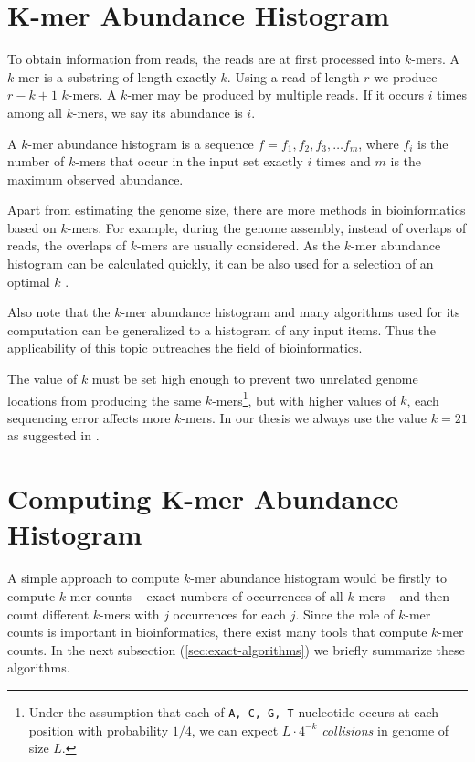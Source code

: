 \section{K-mer Abundance Histogram}
\label{sec:histogram}
To obtain information from reads, the reads are at first processed into $k$-mers. 
A $k$-mer is a substring of length exactly $k$. Using a read of length $r$ we produce 
$r-k+1$ $k$-mers. A $k$-mer may be produced by multiple reads. If it occurs $i$ times
among all $k$-mers, we say its abundance is $i$. 

\begin{definition}
A $k$-mer abundance histogram is a sequence $f = f_1, f_2, f_3, \dots f_m$, 
where $f_i$ is the number of $k$-mers that occur in the input set exactly $i$ times 
and $m$ is the maximum observed abundance.
\end{definition}

Apart from estimating the genome size, there are more methods in bioinformatics based on $k$-mers. 
For example, during the genome assembly, instead of overlaps of reads, the overlaps of 
$k$-mers are usually considered. As the $k$-mer abundance histogram can be calculated
quickly, it can be also used for a selection of an optimal $k$ \cite{Chikhi2013}.

Also note that the $k$-mer abundance histogram and many algorithms used for its computation
can be generalized to a histogram of any input items. Thus the applicability of this topic
outreaches the field of bioinformatics. 

\medskip

The value of $k$ must be set high enough to prevent two unrelated genome locations from 
producing the same $k$-mers\footnote{Under the assumption that each of \texttt{A, C, G, T}
nucleotide occurs at each position with probability $1/4$, we can expect $L \cdot 4^{-k}$ 
\textit{collisions} in genome of size $L$.}, but with higher values of $k$,
each sequencing error affects more $k$-mers. In our thesis we always use
the value $k=21$ as suggested in \cite{Williams2013, Hozza2015}.

\section{Computing K-mer Abundance Histogram}
\label{sec:algorithms}

A simple approach to compute $k$-mer abundance histogram would be firstly to compute $k$-mer
counts -- exact numbers of occurrences of all $k$-mers -- and then count different $k$-mers
with $j$ occurrences for each $j$. Since the role of $k$-mer counts is important in
bioinformatics, there exist many tools that compute $k$-mer counts. 
In the next subsection (\ref{sec:exact-algorithms}) we briefly summarize these algorithms.

